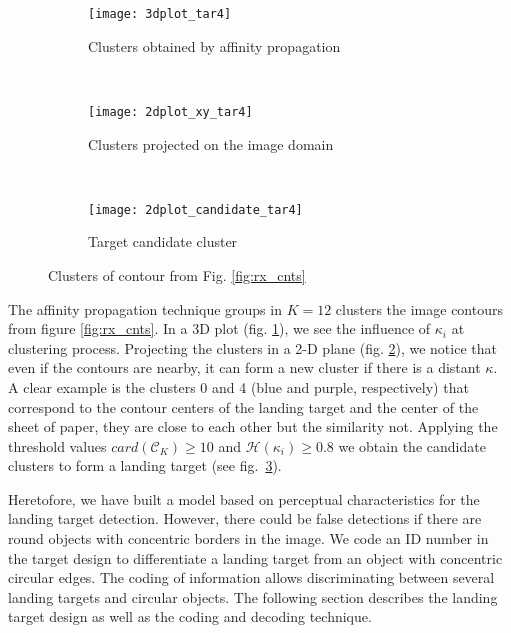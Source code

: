 \begin{figure}[h]
    \centering
    \begin{subfigure}[b]{0.3\textwidth}
        \texttt{[image: 3dplot\_tar4]}
        \caption{Clusters obtained by affinity propagation}
        \label{fig:3dplot}
    \end{subfigure}
    ~ %
    \begin{subfigure}[b]{0.3\textwidth}
        \texttt{[image: 2dplot\_xy\_tar4]}
        \caption{ Clusters projected on the image domain}
        \label{fig:2dplot}
    \end{subfigure}
    ~ %
    \begin{subfigure}[b]{0.3\textwidth}
        \texttt{[image: 2dplot\_candidate\_tar4]}
        \caption{Target candidate cluster}
        \label{fig:candidate}
    \end{subfigure}
   \caption{Clusters of contour from Fig. \ref{fig:rx_cnts}}\label{fig:grouping_process}
\end{figure}

The affinity propagation technique groups in $K=12$ clusters the image contours from figure \ref{fig:rx_cnts}. In a 3D plot (fig. \ref{fig:3dplot}), we see the influence of $\kappa_{i}$ at clustering process. Projecting the clusters in a 2-D plane (fig. \ref{fig:2dplot}), we notice that even if the contours are nearby, it can form a new cluster if there is a distant $\kappa$. A clear example is the clusters 0 and 4 (blue and purple, respectively) that correspond to the contour centers of the landing target and the center of the sheet of paper, they are close to each other but the similarity not. Applying the threshold values $card(\mathcal{C}_{K})\geq 10$ and $\mathcal{H}(\kappa_{i})\geq 0.8$ we obtain the candidate clusters to form a landing target (see fig.~\ref{fig:candidate}). 

Heretofore, we have built a model based on perceptual characteristics for the landing target detection. However, there could be false detections if there are round objects with concentric borders in the image. We code an ID number in the target design to differentiate a landing target from an object with concentric circular edges. The coding of information allows discriminating between several landing targets and circular objects. The following section describes the landing target design as well as the coding and decoding technique. 

